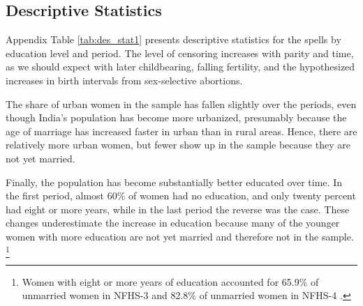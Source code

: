 \documentclass[12pt,letterpaper]{article}
\begin{document}

\subsection{Descriptive Statistics}

Appendix Table \ref{tab:des_stat1} presents descriptive statistics for
the spells by education level and period.
The level of censoring increases with parity and time, as we should expect with later 
childbearing, falling fertility, and the hypothesized increases in birth intervals from 
sex-selective abortions.

The share of urban women in the sample has fallen slightly over the
periods, even though India's population has become more urbanized, presumably because the 
age of marriage has increased faster in urban than in rural areas.
Hence, there are relatively more urban women, but fewer show up in the
sample because they are not yet married.

Finally, the population has become substantially better educated over time.
In the first period, almost 60\% of women had no education, and only twenty percent had
eight or more years, while in the last period the reverse was the case.
These changes underestimate the increase in education because many of the younger women 
with more education are not yet married and therefore not in the sample.%
\footnote{
Women with eight or more years of education accounted for 65.9\% of
unmarried women in NFHS-3 and 82.8\% of unmarried women in NFHS-4
\citep{International-Institute-for-Population-Sciences-IIPS2007,International-Institute-for-Population-Sciences-IIPS2017}.
}


\end{document}
